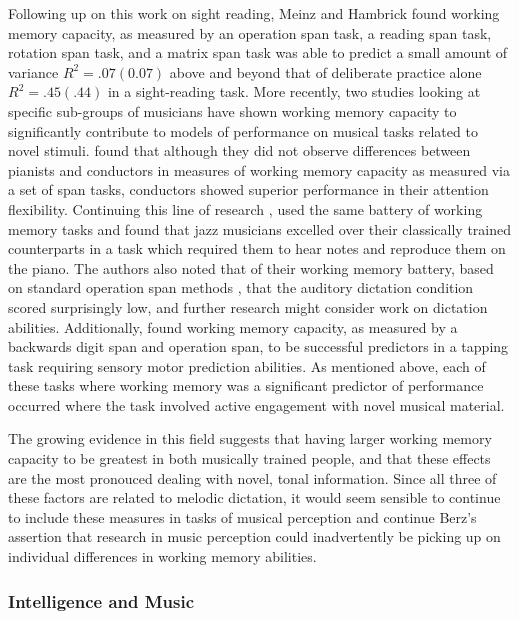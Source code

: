 \documentclass[12pt,]{book}
\begin{document}
Following up on this work on sight reading, Meinz and Hambrick \citep{meinzDeliberatePracticeNecessary2010} found working memory capacity, as measured by an operation span task, a reading span task, rotation span task, and a matrix span task was able to predict a small amount of variance \(R^2=.07 (0.07)\) above and beyond that of deliberate practice alone \(R^2=.45 (.44)\) in a sight-reading task.
More recently, two studies looking at specific sub-groups of musicians have shown working memory capacity to significantly contribute to models of performance on musical tasks related to novel stimuli.
\citet{wollnerAttentionalFlexibilityMemory2016} found that although they did not observe differences between pianists and conductors in measures of working memory capacity as measured via a set of span tasks, conductors showed superior performance in their attention flexibility.
Continuing this line of research \citet{nicholsScoreOneJazz2018}, used the same battery of working memory tasks and found that jazz musicians excelled over their classically trained counterparts in a task which required them to hear notes and reproduce them on the piano.
The authors also noted that of their working memory battery, based on standard operation span methods \citep{engleWorkingMemoryCapacity2002}, that the auditory dictation condition scored surprisingly low, and further research might consider work on dictation abilities.
Additionally, \citet{colleyWorkingMemoryAuditory2017} found working memory capacity, as measured by a backwards digit span and operation span, to be successful predictors in a tapping task requiring sensory motor prediction abilities.
As mentioned above, each of these tasks where working memory was a significant predictor of performance occurred where the task involved active engagement with novel musical material.

The growing evidence in this field suggests that having larger working memory capacity to be greatest in both musically trained people, and that these effects are the most pronouced dealing with novel, tonal information.
Since all three of these factors are related to melodic dictation, it would seem sensible to continue to include these measures in tasks of musical perception and continue Berz's assertion that research in music perception could inadvertently be picking up on individual differences in working memory abilities.

\hypertarget{intelligence-and-music}{%
\subsubsection{Intelligence and Music}\label{intelligence-and-music}}
\end{document}
